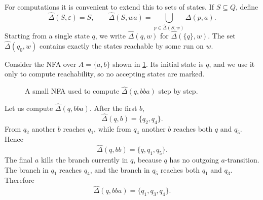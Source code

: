 For computations it is convenient to extend this to sets of states.  If
$S\subseteq Q$, define
\[
  \widehat{\Delta}(S,\varepsilon)=S,
  \qquad
  \widehat{\Delta}(S,wa)=
    \bigcup_{p\in\widehat{\Delta}(S,w)}\Delta(p,a).
\]
Starting from a single state $q$, we write
$\widehat{\Delta}(q,w)$ for
$\widehat{\Delta}(\{q\},w)$.  The set
$\widehat{\Delta}(q_0,w)$ contains exactly the states reachable by some
run on $w$.

\begin{example}
\label{ex:nfa-reachable-states}
Consider the NFA over $A=\{a,b\}$ shown in
\cref{fig:nfa-reachable-states}.  Its initial state is $q$, and we use
it only to compute reachability, so no accepting states are marked.
\end{example}

\begin{figure}[ht]
\centering
{}
\caption{A small NFA used to compute $\widehat{\Delta}(q,bba)$ step by step.}
\label{fig:nfa-reachable-states}
\end{figure}

Let us compute $\widehat{\Delta}(q,bba)$.
After the first $b$,
\[
  \widehat{\Delta}(q,b)=\{q_2,q_4\}.
\]
From $q_2$ another $b$ reaches $q_1$, while from $q_4$ another $b$
reaches both $q$ and $q_5$.  Hence
\[
  \widehat{\Delta}(q,bb)=\{q,q_1,q_5\}.
\]
The final $a$ kills the branch currently in $q$, because $q$ has no
outgoing $a$-transition.  The branch in $q_1$ reaches $q_4$, and the
branch in $q_5$ reaches both $q_1$ and $q_3$.  Therefore
\[
  \widehat{\Delta}(q,bba)=\{q_1,q_3,q_4\}.
\]

